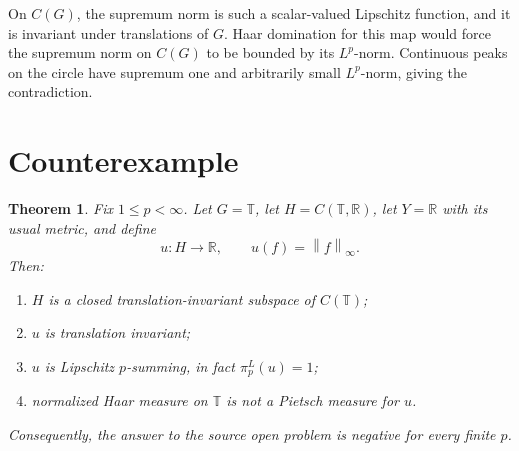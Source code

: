\documentclass[11pt]{article}
\newtheorem{theorem}{Theorem}
\theoremstyle{definition}
\newcommand{\T}{\mathbb T}
\newcommand{\R}{\mathbb R}
\newcommand{\norm}[1]{\left\lVert #1\right\rVert}
\begin{document}
On \(C(G)\), the supremum norm is such a scalar-valued Lipschitz function, and
it is invariant under translations of \(G\).  Haar domination for this map
would force the supremum norm on \(C(G)\) to be bounded by its \(L^p\)-norm.
Continuous peaks on the circle have supremum one and arbitrarily small
\(L^p\)-norm, giving the contradiction.

\section{Counterexample}

\begin{theorem}\label{thm:counterexample}
Fix \(1\le p<\infty\).  Let \(G=\T\), let
\(H=C(\T,\R)\), let \(Y=\R\) with its usual metric, and define
\[
 u:H\longrightarrow\R,\qquad u(f)=\norm{f}_{\infty}.
\]
Then:
\begin{enumerate}
\item \(H\) is a closed translation-invariant subspace of \(C(\T)\);
\item \(u\) is translation invariant;
\item \(u\) is Lipschitz \(p\)-summing, in fact \(\pi_p^L(u)=1\);
\item normalized Haar measure on \(\T\) is not a Pietsch measure for \(u\).
\end{enumerate}
Consequently, the answer to the source open problem is negative for every
finite \(p\).
\end{theorem}
\end{document}
